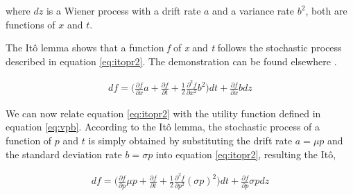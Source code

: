\documentclass[11pt, onecolumn]{article}
\begin{document}
where $dz$ is a Wiener process with a drift rate $a$ and a variance rate $b^2$, both are functions of $x$ and $t$.

The It\^{o} lemma shows that a function \emph{f} of \emph{x} and \emph{t} follows the stochastic process described in equation \ref{eq:itopr2}. The demonstration can be found elsewhere \citep{shreve_stochastic_2010}.

\begin{equation}
\begin{split}
   df = \bigg(\frac{\partial f}{\partial x} a  + \frac{\partial f}{\partial t} + \frac{1}{2}\frac{\partial ^2 f}{\partial x^2} b^2 \bigg)dt + \frac{\partial f}{\partial x}b dz
\end{split}
\label{eq:itopr2}
\end{equation}

We can now relate equation \ref{eq:itopr2} with the utility function defined in equation \ref{eq:vpb}. According to the It\^{o} lemma, the stochastic process of a function of $p$ and $t$ is simply obtained by substituting the drift rate $a = \mu p$ and the standard deviation rate $b = \sigma p$ into equation \ref{eq:itopr2}, resulting the It\^{o},

\begin{equation}
\begin{split}
   df = \bigg(\frac{\partial f}{\partial p} \mu p  + \frac{\partial f}{\partial t} + \frac{1}{2}\frac{\partial ^2 f}{\partial p^2} (\sigma p)^2 \bigg)dt + \frac{\partial f}{\partial p}\sigma p dz
\end{split}
\label{eq:itopr3}
\end{equation}
\end{document}
